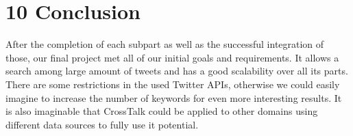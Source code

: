 \chapter*{10    Conclusion}
\setcounter{chapter}{10}
\setcounter{section}{0}

After the completion of each subpart as well as the successful integration of those, our final project met all of our initial goals and requirements. It allows a search among large amount of tweets and has a good scalability over all its parts. There are some restrictions in the used Twitter APIs, otherwise we could easily imagine to increase the number of keywords for even more interesting results. It is also imaginable that CrossTalk could be applied to other domains using different data sources to fully use it potential.